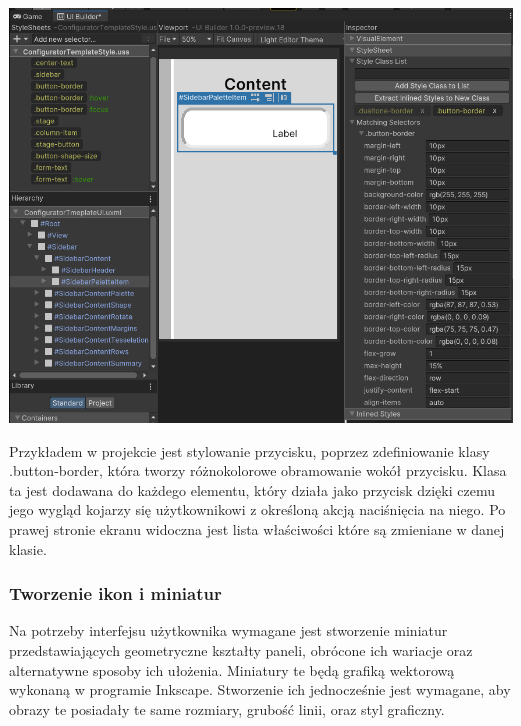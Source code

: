 \documentclass{article} %
\begin{document}
            \begin{center}
            \includegraphics[scale=0.35,keepaspectratio=true]{images/screenshots/work/6-tworzenie-ui_003.png}
            \end{center}

            
            Przykładem w projekcie jest stylowanie przycisku, poprzez zdefiniowanie klasy .button-border, która tworzy różnokolorowe obramowanie wokół przycisku. Klasa ta jest dodawana do każdego elementu, który działa jako przycisk dzięki czemu jego wygląd kojarzy się użytkownikowi z określoną akcją naciśnięcia na niego. Po prawej stronie ekranu widoczna jest lista właściwości które są zmieniane w danej klasie.
            \\
            
        \subsubsection*{Tworzenie ikon i miniatur}
            Na potrzeby interfejsu użytkownika wymagane jest stworzenie miniatur przedstawiających geometryczne kształty paneli, obrócone ich wariacje oraz alternatywne sposoby ich ułożenia. Miniatury te będą grafiką wektorową wykonaną w programie Inkscape. Stworzenie ich jednocześnie jest wymagane, aby obrazy te posiadały te same rozmiary, grubość linii, oraz styl graficzny.
            \\
            
\end{document}
